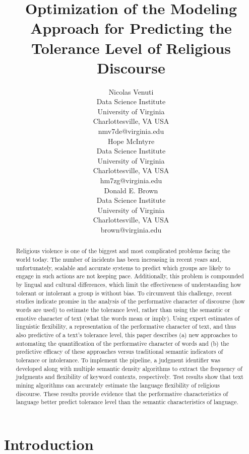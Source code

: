 \documentclass[11pt]{article}
\title{Optimization of the Modeling Approach for Predicting the Tolerance Level of Religious Discourse}
\author{Nicolas Venuti \\
  Data Science Institute \\
  University of Virginia \\
  Charlottesville, VA USA \\
  {nmv7de@virginia.edu} \\\And
  Hope McIntyre \\
  Data Science Institute \\
  University of Virginia \\
  Charlottesville, VA USA \\
  {hm7zg@virginia.edu}\\\And
  Donald E. Brown \\
  Data Science Institute \\
  University of Virginia \\
  Charlottesville, VA USA \\
  {brown@virginia.edu} \\}
\date{}
\begin{document}
\maketitle
\begin{abstract}
Religious violence is one of the biggest and most complicated problems facing the world today. The number of incidents has been increasing in recent years and, unfortunately, scalable and accurate systems to predict which groups are likely to engage in such actions are not keeping pace. Additionally, this problem is compounded by lingual and cultural differences, which limit the effectiveness of understanding how tolerant or intolerant a group is without bias. To circumvent this challenge, recent studies indicate promise in the analysis of the performative character of discourse (how words are used) to estimate the tolerance level, rather than using the semantic or emotive character of text (what the words mean or imply). Using expert estimates of linguistic flexibility, a representation of the performative character of text, and thus also predictive of a text’s tolerance level, this paper describes (a) new approaches to automating the quantification of the performative character of words and (b) the predictive efficacy of these approaches versus traditional semantic indicators of tolerance or intolerance. To implement the pipeline, a judgment identifier was developed along with multiple semantic density algorithms to extract the frequency of judgments and flexibility of keyword contexts, respectively. Test results show that text mining algorithms can accurately estimate the language flexibility of religious discourse. These results provide evidence that the performative characteristics of language better predict tolerance level than the semantic characteristics of language.


\end{abstract}

\section{Introduction}\label{Intro}

\end{document}
